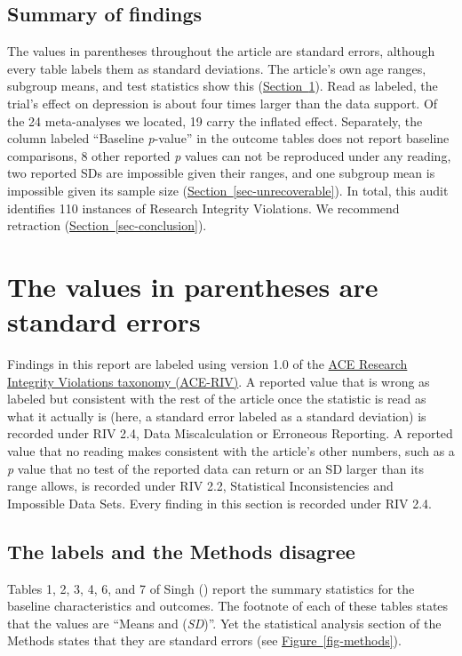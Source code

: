 \documentclass[
  letterpaper,
  DIV=11,
  numbers=noendperiod]{scrartcl}
\begin{document}
\subsection{Summary of findings}\label{summary-of-findings}

The values in parentheses throughout the article are standard errors,
although every table labels them as standard deviations. The article's
own age ranges, subgroup means, and test statistics show this
(\hyperref[sec-se-sd]{Section~\ref*{sec-se-sd}}). Read as labeled, the
trial's effect on depression is about four times larger than the data
support. Of the 24 meta-analyses we located, 19 carry the inflated
effect. Separately, the column labeled ``Baseline \emph{p}-value'' in
the outcome tables does not report baseline comparisons, 8 other
reported \emph{p} values can not be reproduced under any reading, two
reported SDs are impossible given their ranges, and one subgroup mean is
impossible given its sample size
(\hyperref[sec-unrecoverable]{Section~\ref*{sec-unrecoverable}}). In
total, this audit identifies 110 instances of Research Integrity
Violations. We recommend retraction
(\hyperref[sec-conclusion]{Section~\ref*{sec-conclusion}}).

\section{The values in parentheses are standard errors}\label{sec-se-sd}

Findings in this report are labeled using version 1.0 of the
\href{https://auditclinicalevidence.org/riv.html}{ACE Research Integrity
Violations taxonomy (ACE-RIV)}. A reported value that is wrong as
labeled but consistent with the rest of the article once the statistic
is read as what it actually is (here, a standard error labeled as a
standard deviation) is recorded under RIV 2.4, Data Miscalculation or
Erroneous Reporting. A reported value that no reading makes consistent
with the article's other numbers, such as a \emph{p} value that no test
of the reported data can return or an SD larger than its range allows,
is recorded under RIV 2.2, Statistical Inconsistencies and Impossible
Data Sets. Every finding in this section is recorded under RIV 2.4.

\subsection{The labels and the Methods disagree}\label{sec-labels}

Tables 1, 2, 3, 4, 6, and 7 of Singh ()
report the summary statistics for the baseline characteristics and
outcomes. The footnote of each of these tables states that the values
are ``Means and (\emph{SD})''. Yet the statistical analysis section of
the Methods states that they are standard errors (see
\hyperref[fig-methods]{Figure~\ref*{fig-methods}}).
\end{document}
